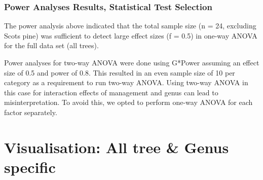 \documentclass[
]{article}
\begin{document}
\subsubsection{Power Analyses Results, Statistical Test
Selection}\label{power-analyses-results-statistical-test-selection}

The power analysis above indicated that the total sample size (n = 24,
excluding Scots pine) was sufficient to detect large effect sizes (f =
0.5) in one-way ANOVA for the full data set (all trees).

Power analyses for two-way ANOVA were done using G*Power assuming an
effect size of 0.5 and power of 0.8. This resulted in an even sample
size of 10 per category as a requirement to run two-way ANOVA. Using
two-way ANOVA in this case for interaction effects of management and
genus can lead to misinterpretation. To avoid this, we opted to perform
one-way ANOVA for each factor separately.

\section{Visualisation: All tree \& Genus
specific}\label{visualisation-all-tree-genus-specific}
\end{document}
